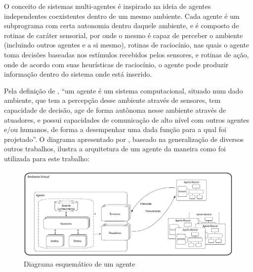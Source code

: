 \documentclass{article}
\begin{document}
O conceito de sistemas multi-agentes é inspirado na ideia de agentes independentes
coexistentes dentro de um mesmo ambiente. Cada agente é um subprograma com
certa autonomia dentro daquele ambiente, e é composto de rotinas de caráter sensorial,
por onde o mesmo é capaz de perceber o ambiente (incluindo outros agentes e a si
mesmo), rotinas de raciocínio, nas quais o agente toma decisões baseadas nos estímulos
recebidos pelos sensores, e rotinas de ação, onde de acordo com suas heurísticas de
raciocínio, o agente pode produzir informação dentro do sistema onde está inserido.

Pela definição de \cite{reis-2002}, ``um agente é um sistema computacional, situado
num dado ambiente, que tem a percepção desse ambiente através de sensores, tem
capacidade de decisão, age de forma autônoma nesse ambiente através de atuadores, e
possui capacidades de comunicação de alto nível com outros agentes e/ou humanos, de
forma a desempenhar uma dada função para a qual foi projetado''. O diagrama
apresentado por \cite{Thomaz-2011}, baseado na generalização de diversos outros trabalhos,
ilustra a arquitetura de um agente da maneira como foi utilizada para este trabalho:

\begin{figure}
	\centering
	\includegraphics[width=\textwidth]{figures/agent}
	\caption{Diagrama esquemático de um agente}
	\label{fig:mas}
\end{figure}
\end{document}
